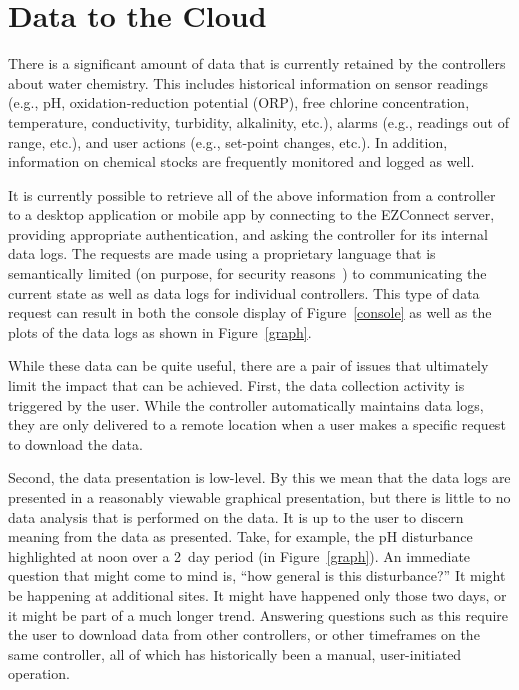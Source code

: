 \section{Data to the Cloud}
\label{sec:cloud}

There is a significant amount of data that is currently retained by
the controllers about water chemistry.  This includes historical
information on sensor readings (e.g., pH, oxidation-reduction potential (ORP),
free chlorine concentration, temperature, conductivity, turbidity,
alkalinity, etc.),
alarms (e.g., readings out of range, etc.), and user actions (e.g.,
set-point changes, etc.).
In addition, information on chemical stocks are frequently monitored
and logged as well.

It is currently possible to retrieve all of the above information from
a controller to a desktop application or mobile app by connecting to
the EZConnect server, providing appropriate authentication, and asking
the controller for its internal data logs.
The requests are made using a proprietary language that is
semantically limited (on purpose, for security
reasons~\cite{ezconnect,ccgss18}) to communicating the current
state as well as data logs for individual controllers.
This type of data request can result in both the console display of
Figure~\ref{console} as well as the plots of the data logs as shown
in Figure~\ref{graph}.

While these data can be quite useful, there are a pair of issues that
ultimately limit the impact that can be achieved.  First, the data
collection activity is triggered by the user.  While the controller
automatically maintains data logs, they are only delivered to a remote
location when a user makes a specific request to download the data.

Second, the data presentation is low-level.  By this we mean that
the data logs are presented in a reasonably viewable graphical presentation,
but there is little to no data analysis that is performed on the data.
It is up to the user to discern meaning from the data as presented.
Take, for example, the pH disturbance highlighted at noon over a 2~day
period (in Figure~\ref{graph}).  An immediate question that might come
to mind is, ``how general is this disturbance?'' It might be happening
at additional sites.  It might have happened only those two days, or it
might be part of a much longer trend.  Answering questions such as this require
the user to download data from other controllers, or other timeframes
on the same controller, all of which has historically been a manual,
user-initiated operation.

